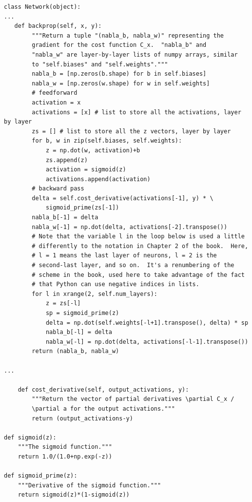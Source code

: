 \begin{lstlisting}
class Network(object):
...
   def backprop(self, x, y):
        """Return a tuple "(nabla_b, nabla_w)" representing the
        gradient for the cost function C_x.  "nabla_b" and
        "nabla_w" are layer-by-layer lists of numpy arrays, similar
        to "self.biases" and "self.weights"."""
        nabla_b = [np.zeros(b.shape) for b in self.biases]
        nabla_w = [np.zeros(w.shape) for w in self.weights]
        # feedforward
        activation = x
        activations = [x] # list to store all the activations, layer by layer
        zs = [] # list to store all the z vectors, layer by layer
        for b, w in zip(self.biases, self.weights):
            z = np.dot(w, activation)+b
            zs.append(z)
            activation = sigmoid(z)
            activations.append(activation)
        # backward pass
        delta = self.cost_derivative(activations[-1], y) * \
            sigmoid_prime(zs[-1])
        nabla_b[-1] = delta
        nabla_w[-1] = np.dot(delta, activations[-2].transpose())
        # Note that the variable l in the loop below is used a little
        # differently to the notation in Chapter 2 of the book.  Here,
        # l = 1 means the last layer of neurons, l = 2 is the
        # second-last layer, and so on.  It's a renumbering of the
        # scheme in the book, used here to take advantage of the fact
        # that Python can use negative indices in lists.
        for l in xrange(2, self.num_layers):
            z = zs[-l]
            sp = sigmoid_prime(z)
            delta = np.dot(self.weights[-l+1].transpose(), delta) * sp
            nabla_b[-l] = delta
            nabla_w[-l] = np.dot(delta, activations[-l-1].transpose())
        return (nabla_b, nabla_w)

...

    def cost_derivative(self, output_activations, y):
        """Return the vector of partial derivatives \partial C_x /
        \partial a for the output activations."""
        return (output_activations-y)

def sigmoid(z):
    """The sigmoid function."""
    return 1.0/(1.0+np.exp(-z))

def sigmoid_prime(z):
    """Derivative of the sigmoid function."""
    return sigmoid(z)*(1-sigmoid(z))

\end{lstlisting}

